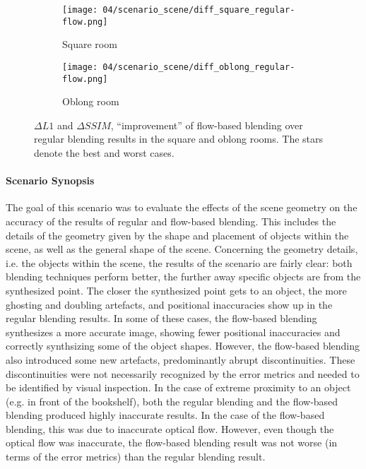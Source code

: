 \begin{figure}
\centering
    \hfill
    \begin{subfigure}[b]{0.45\textwidth}
            \centering
            \texttt{[image: 04/scenario\_scene/diff\_square\_regular-flow.png]}
            \caption{Square room}
    \end{subfigure}
    \hfill
    \begin{subfigure}[b]{0.45\textwidth}
            \centering
            \texttt{[image: 04/scenario\_scene/diff\_oblong\_regular-flow.png]}
            \caption{Oblong room}
    \end{subfigure}
    \hfill
  \caption[Improvement of flow-based blending results over regular blending results in the square and oblong rooms]{$\Delta L1$ and $\Delta SSIM$, ``improvement'' of flow-based blending over regular blending results in the square and oblong rooms. The stars denote the best and worst cases.} \label{fig:scene_diff_square_oblong}
\end{figure}

\paragraph{Scenario Synopsis}
The goal of this scenario was to evaluate the effects of the scene geometry on the accuracy of the results of regular and flow-based blending. This includes the details of the geometry given by the shape and placement of objects within the scene, as well as the general shape of the scene.
Concerning the geometry details, i.e. the objects within the scene, the results of the scenario are fairly clear: both blending techniques perform better, the further away specific objects are from the synthesized point. The closer the synthesized point gets to an object, the more ghosting and doubling artefacts, and positional inaccuracies show up in the regular blending results.
In some of these cases, the flow-based blending synthesizes a more accurate image, showing fewer positional inaccuracies and correctly synthsizing some of the object shapes. However, the flow-based blending also introduced some new artefacts, predominantly abrupt discontinuities. These discontinuities were not necessarily recognized by the error metrics and needed to be identified by visual inspection. In the case of extreme proximity to an object (e.g. in front of the bookshelf), both the regular blending and the flow-based blending produced highly inaccurate results. In the case of the flow-based blending, this was due to inaccurate optical flow. However, even though the optical flow was inaccurate, the flow-based blending result was not worse (in terms of the error metrics) than the regular blending result.

